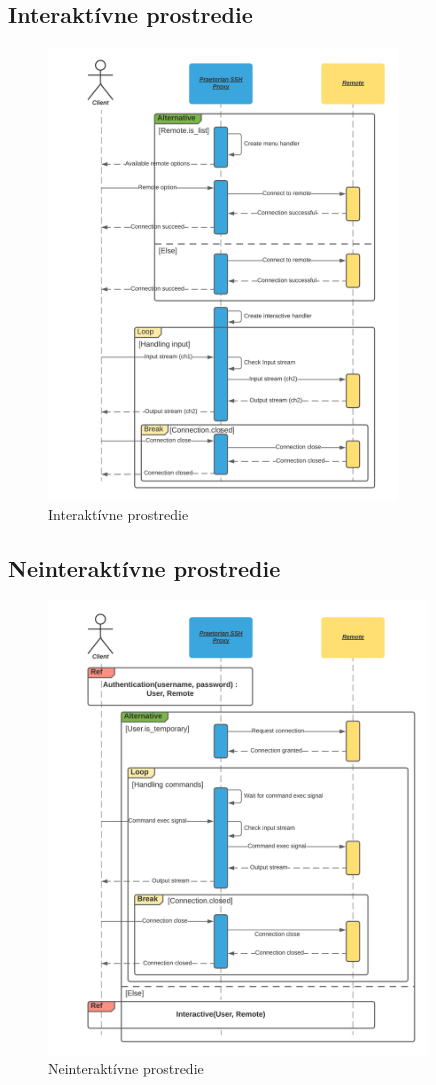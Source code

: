 \subsection{Interaktívne prostredie}\label{subsec:interkativne-prostredie}

\begin{figure}[H]
\begin{center}\includegraphics[width=\textwidth,height=12cm,keepaspectratio=true]{assets/sequence_diagram_interactive.png}\end{center}
\caption[Interaktívne prostredie]{Interaktívne prostredie}\label{fig:obr_11}
\end{figure}


\subsection{Neinteraktívne prostredie}\label{subsec:neinterkativne-prostredie}

\begin{figure}[H]
\begin{center}\includegraphics[width=\textwidth,height=12cm,keepaspectratio=true]{assets/sequence_diagram_non_interactive.png}\end{center}
\caption[Neinteraktívne prostredie]{Neinteraktívne prostredie}\label{fig:obr_12}
\end{figure}
